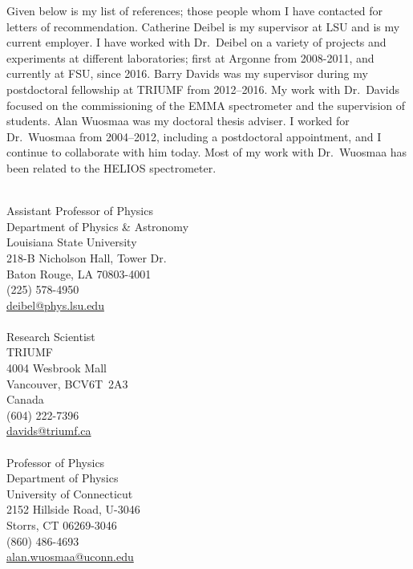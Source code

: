  {
\par Given below is my list of references; those people whom I have contacted for letters of recommendation.
Catherine Deibel is my supervisor at LSU and is my current employer. I have worked with Dr.\ Deibel on a variety of projects and experiments at different laboratories; first %
at Argonne from 2008-2011, and currently at FSU, since 2016.
Barry Davids was my supervisor during my postdoctoral fellowship at TRIUMF from 2012--2016. My work with 
 Dr.\ Davids focused on the %
 commissioning of the EMMA spectrometer and the supervision of students.
Alan Wuosmaa was my doctoral thesis adviser. I worked for Dr.\ Wuosmaa from %
2004--2012, including a postdoctoral appointment, and I continue to collaborate with him today.  Most of my work with Dr.\ Wuosmaa has been related to the HELIOS spectrometer.
\cfoot{}
\vspace{2.0\baselineskip}%
{\setlength{\parindent}{0in}%


\\
Assistant Professor of Physics\\
Department of Physics \& Astronomy\\
Louisiana State University\\
218-B Nicholson Hall, Tower Dr.\\
Baton Rouge, LA 70803-4001\\
(225) 578-4950\\
\href{mailto:deibel@phys.lsu.edu}{deibel@phys.lsu.edu}\\
 
\\
Research Scientist\\
TRIUMF\\
4004 Wesbrook Mall\\
Vancouver, BC\hspace{6pt}V6T~2A3\\
Canada\\
(604) 222-7396\\
\href{mailto:davids@triumf.ca}{davids@triumf.ca}\\

\\
Professor of Physics\\
Department of Physics\\
University of Connecticut\\
2152 Hillside Road, U-3046\\
Storrs,  CT 06269-3046\\
(860) 486-4693\\
\href{mailto:alan.wuosmaa@uconn.edu}{alan.wuosmaa@uconn.edu}\\
}
}
